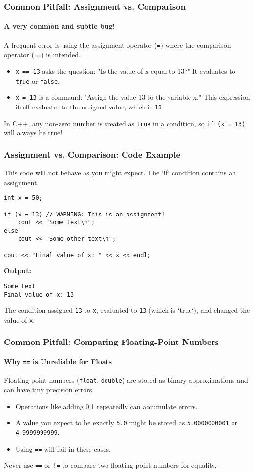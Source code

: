 \documentclass{beamer}
\begin{document}
\begin{frame}
\frametitle{Common Pitfall: Assignment vs. Comparison}
\framesubtitle{A very common and subtle bug!}

A frequent error is using the assignment operator (\texttt{=}) where the comparison operator (\texttt{==}) is intended.

\begin{itemize}
    \item \texttt{x == 13} asks the question: "Is the value of x equal to 13?" It evaluates to \texttt{true} or \texttt{false}.
    \pause
    \item \texttt{x = 13} is a command: "Assign the value 13 to the variable x." This expression itself evaluates to the assigned value, which is \texttt{13}.
\end{itemize}

In C++, any non-zero number is treated as \texttt{true} in a condition, so \texttt{if (x = 13)} will \alert{always} be true!
\end{frame}

\begin{frame}[fragile]
\frametitle{Assignment vs. Comparison: Code Example}
This code will not behave as you might expect. The `if` condition contains an assignment.

\begin{verbatim}
int x = 50;

if (x = 13) // WARNING: This is an assignment!
    cout << "Some text\n";
else
    cout << "Some other text\n";

cout << "Final value of x: " << x << endl;
\end{verbatim}
\pause
\vfill
\textbf{Output:}
\begin{verbatim}
Some text
Final value of x: 13
\end{verbatim}
The condition assigned \texttt{13} to \texttt{x}, evaluated to \texttt{13} (which is `true`), and changed the value of \texttt{x}.
\end{frame}


\begin{frame}
\frametitle{Common Pitfall: Comparing Floating-Point Numbers}
\framesubtitle{Why \texttt{==} is Unreliable for Floats}
Floating-point numbers (\texttt{float}, \texttt{double}) are stored as binary approximations and can have tiny precision errors.

\begin{itemize}
    \item Operations like adding 0.1 repeatedly can accumulate errors.
    \item A value you expect to be exactly \texttt{5.0} might be stored as \texttt{5.0000000001} or \texttt{4.9999999999}.
    \item Using \texttt{==} will fail in these cases.
\end{itemize}
\pause
\alert{Never use \texttt{==} or \texttt{!=} to compare two floating-point numbers for equality.}
\end{frame}
\end{document}
